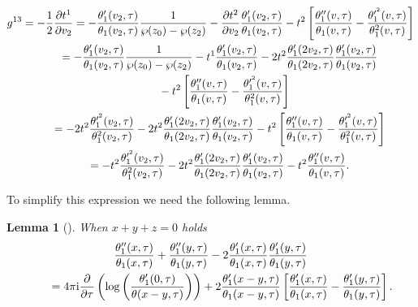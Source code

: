 \documentclass[10pt,a4paper]{amsart}
\numberwithin{equation}{section}
\newtheorem{Lemma}[Theorem]{Lemma}
\begin{document}
\begin{gather}
g^{13}=-\frac{1}{2}\frac{\partial t^{1}}{\partial v_2}=-\frac{\theta_1^{\prime}(v_2,\tau)} {\theta_1(v_2,\tau)}\frac{1}{\wp(z_0) -\wp(z_2)}-\frac{\partial t^2}{\partial v_2} \frac{\theta_1^{\prime}(v_2,\tau)}{\theta_1(v_2,\tau)} -t^2\left[\frac{\theta_1^{\prime\prime}(v,\tau)}{\theta_1(v,\tau)} -\frac{\theta_1^{\prime^2}(v,\tau)}{\theta_1^2(v,\tau)}\right]\nonumber
\\ \hphantom{g^{13}}
{}=-\frac{\theta_1^{\prime}(v_2,\tau)}{\theta_1(v_2,\tau)}\frac{1}{\wp(z_0)-\wp(z_2)} -t^1\frac{\theta_1^{\prime}(v_2,\tau)}{\theta_1(v_2,\tau)} -2t^2\frac{\theta_1^{\prime}(2v_2,\tau)}{\theta_1(2v_2,\tau)} \frac{\theta_1^{\prime}(v_2,\tau)}{\theta_1(v_2,\tau)}\nonumber
\\ \hphantom{g^{13}=}
-t^2\left[\frac{\theta_1^{\prime\prime}(v,\tau)}{\theta_1(v,\tau)} -\frac{\theta_1^{\prime^2}(v,\tau)}{\theta_1^2(v,\tau)}\right]\nonumber
\\ \hphantom{g^{13}}
=-2t^2\frac{\theta_1^{\prime^2}(v_2,\tau)}{\theta_1^2(v_2,\tau)}-2t^2\frac{\theta_1^
{\prime}(2v_2,\tau)}{\theta_1(2v_2,\tau)}\frac{\theta_1^{\prime}(v_2,\tau)}{\theta_1(v_2,\tau)} -t^2\left[\frac{\theta_1^{\prime\prime}(v,\tau)}{\theta_1(v,\tau)} -\frac{\theta_1^{\prime^2}(v,\tau)}{\theta_1^2(v,\tau)}\right]\nonumber
\\ \hphantom{g^{13}}
=-t^2\frac{\theta_1^{\prime^2}(v_2,\tau)}{\theta_1^2(v_2,\tau)}
-2t^2\frac{\theta_1^{\prime}(2v_2,\tau)}{\theta_1(2v_2,\tau)}
\frac{\theta_1^{\prime}(v_2,\tau)}{\theta_1(v_2,\tau)}
-t^2\frac{\theta_1^{\prime\prime}(v,\tau)}{\theta_1(v,\tau)}.\label{g131}
\end{gather}

To simplify this expression we need the following lemma.

\begin{Lemma}[\cite{BertolaM.1}]\label{lemmaa1l}
When $x+y+z=0$ holds
\begin{gather}
\frac{\theta_1^{\prime\prime}(x,\tau)}{\theta_1(x,\tau)}
+\frac{\theta_1^{\prime\prime}(y,\tau)}{\theta_1(y,\tau)}
-2\frac{\theta_1^{\prime}(x,\tau)}{\theta_1(x,\tau)}
\frac{\theta_1^{\prime}(y,\tau)}{\theta_1(y,\tau)}\nonumber
\\ \qquad
=4\pi {\rm i} \frac{\partial}{\partial \tau}\left(\log\left(\frac{\theta_1^{\prime}(0,\tau)}{\theta(x-y,\tau)}\right)\right) +2\frac{\theta_1^{\prime}(x-y,\tau)}{\theta_1(x-y,\tau)} \left[\frac{\theta_1^{\prime}(x,\tau)}{\theta_1(x,\tau)} -\frac{\theta_1^{\prime}(y,\tau)}{\theta_1(y,\tau)}\right].
\label{lemmaa1}
\end{gather}
\end{Lemma}
\end{document}
